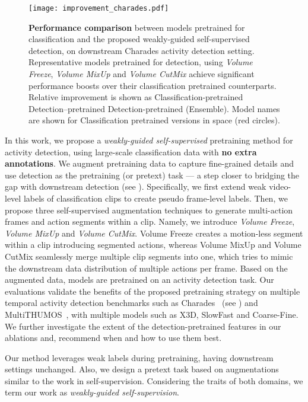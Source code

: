 \documentclass[letterpaper]{article} \usepackage{aaai23}  \usepackage{times}  \usepackage{helvet}  \usepackage{courier}  \usepackage[hyphens]{url}  \usepackage{graphicx} \urlstyle{rm} \def\UrlFont{\rm}  \usepackage{natbib}  \usepackage{caption} \frenchspacing  \setlength{\pdfpagewidth}{8.5in}  \setlength{\pdfpageheight}{11in}  \usepackage{algorithm}
\newcommand{\ch}{}
\begin{document}
\begin{figure}[t]
	\centering
	\texttt{[image: improvement\_charades.pdf]}
	\caption{\textbf{Performance comparison} between models pretrained for classification and the proposed weakly-guided self-supervised detection, on downstream Charades \cite{sigurdsson2016hollywood} activity detection setting.  Representative models pretrained for detection, using \textit{Volume Freeze}, \textit{Volume MixUp} and \textit{Volume CutMix} achieve significant performance boosts over their classification pretrained counterparts. Relative improvement is shown as Classification-pretrained  Detection--pretrained  Detection-pretrained (Ensemble). Model names are shown for Classification pretrained versions in space (red circles). }
	\label{fig:improvement}
\end{figure}


In this work, we propose a \textit{weakly-guided self-supervised} pretraining method for activity detection, using large-scale classification data with \textbf{no extra annotations}. We augment pretraining data to capture fine-grained details 
and use detection as the pretraining (or pretext) task --- a step closer to bridging the gap with downstream detection (see ). Specifically, we first extend weak video-level labels of classification clips to create pseudo frame-level labels. Then, we propose three self-supervised augmentation techniques to generate multi-action frames and action segments within a clip. Namely, we introduce \textit{Volume Freeze}, \textit{Volume MixUp} and \textit{Volume CutMix}. Volume Freeze creates a motion-less segment within a clip introducing segmented actions, whereas Volume MixUp and Volume CutMix seamlessly merge multiple clip segments into one, which tries to mimic the downstream data distribution of multiple actions per frame. Based on the augmented data, models are pretrained on an activity detection task. Our evaluations validate the benefits of the proposed pretraining strategy on multiple temporal activity detection benchmarks such as Charades~\cite{sigurdsson2016hollywood} (see ) and MultiTHUMOS~\cite{yeung2018every}, with multiple models such as X3D, SlowFast and Coarse-Fine. We further investigate the extent of the detection-pretrained features in our ablations and, recommend when and how to use them best.

\ch{Our method leverages weak labels 
during pretraining, having downstream settings unchanged. Also, we design a pretext task based on augmentations similar to the work in self-supervision.  Considering the traits of both domains, we term our work as \textit{weakly-guided self-supervision}.}
\end{document}

